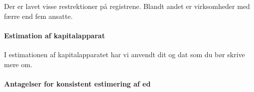 Der er lavet visse restrektioner på registrene. Blandt andet er virksomheder med færre end fem ansatte. 

\paragraph{Estimation af kapitalapparat} 
I estimationen af kapitalapparatet har vi anvendt dit og dat som du bør skrive mere om.

\paragraph{Antagelser for konsistent estimering af ed}
